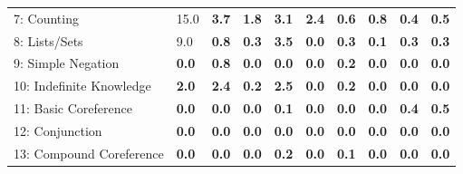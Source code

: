 \documentclass[ko,indentfirst,twoside,ms]{snuthesis_utf8}
\begin{document}
\begin{table}[h]
\begin{adjustbox}{max width=0.95\textwidth}
\begin{tabular}{l|llllllll>{\columncolor[gray]{0.8}}l}
7: Counting                          & 15.0                      & \textbf{3.7}                       & \textbf{1.8}                         & \textbf{3.1}                     & \textbf{2.4}                      & \textbf{0.6}                    & \textbf{0.8}                        &\textbf{0.4}                &\textbf{0.5}                    \\
8: Lists/Sets                        & 9.0                       & \textbf{0.8}                        & \textbf{0.3}                         & \textbf{3.5}                     & \textbf{0.0}                     & \textbf{0.3}                     &\textbf{0.1} & \textbf{0.3}                   & \textbf{0.3}                     \\
9: Simple Negation                   & \textbf{0.0}                       & \textbf{0.8}                        & \textbf{0.0}                         & \textbf{0.0 } & \textbf{0.0}                      & \textbf{0.2}                     &\textbf{ 0.0 }                       & \textbf{0.0}                   &\textbf{0.0}                    \\
10: Indefinite Knowledge             & \textbf{2.0}                       & \textbf{2.4}                      & \textbf{0.2} &\textbf{2.5}                     & \textbf{0.0}                      & \textbf{0.2}                     & \textbf{0.0}                        & \textbf{0.0}                    & \textbf{0.0}                   \\
11: Basic Coreference                & \textbf{0.0}                       & \textbf{0.0}                        & \textbf{0.0}                         & \textbf{0.1}                    & \textbf{0.0}                      & \textbf{0.0}                     & \textbf{0.0}                        & \textbf{0.4}                  & \textbf{0.5}                    \\
12: Conjunction                      & \textbf{0.0}                       & \textbf{0.0}                        & \textbf{0.0}                         & \textbf{0.0}                     &\textbf{0.0}                      &\textbf{0.0}                     & \textbf{0.0}                        & \textbf{0.0}                   & \textbf{0.0}                     \\
13: Compound Coreference             & \textbf{0.0}                       & \textbf{0.0}                        & \textbf{0.0} & \textbf{0.2}                     & \textbf{0.0}                      & \textbf{0.1} & \textbf{0.0}                        & \textbf{0.0}                 & \textbf{0.0}                     \\

\end{tabular}
\end{adjustbox}
\end{table}
\end{document}

